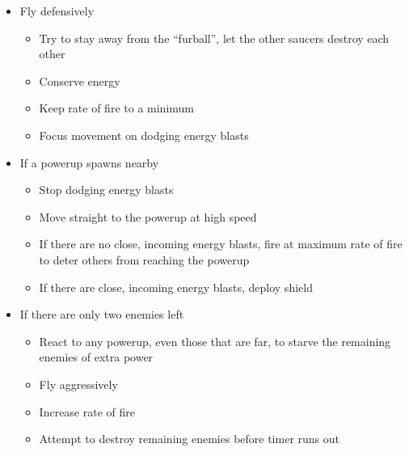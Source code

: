 \begin{itemize}
\item Fly defensively
	\begin{itemize}
	\item Try to stay away from the ``furball'', let the other saucers destroy each other
	\item Conserve energy
	\item Keep rate of fire to a minimum
	\item Focus movement on dodging energy blasts
	\end{itemize}
\item If a powerup spawns nearby
	\begin{itemize}
	\item Stop dodging energy blasts
	\item Move straight to the powerup at high speed
	\item If there are no close, incoming energy blasts, fire at maximum rate of fire to deter others from reaching the powerup
	\item If there are close, incoming energy blasts, deploy shield
	\end{itemize}
\item If there are only two enemies left
	\begin{itemize}
	\item React to any powerup, even those that are far, to starve the remaining enemies of extra power
	\item Fly aggressively
	\item Increase rate of fire
	\item Attempt to destroy remaining enemies before timer runs out
	\end{itemize}
\end{itemize}